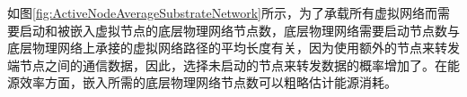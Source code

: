 如图\ref{fig:ActiveNodeAverageSubstrateNetwork}所示，为了承载所有虚拟网络而需要启动和被嵌入虚拟节点的底层物理网络节点数，底层物理网络需要启动节点数与底层物理网络上承接的虚拟网络路径的平均长度有关，因为使用额外的节点来转发端节点之间的通信数据，因此，选择未启动的节点来转发数据的概率增加了。在能源效率方面，嵌入所需的底层物理网络节点数可以粗略估计能源消耗。

